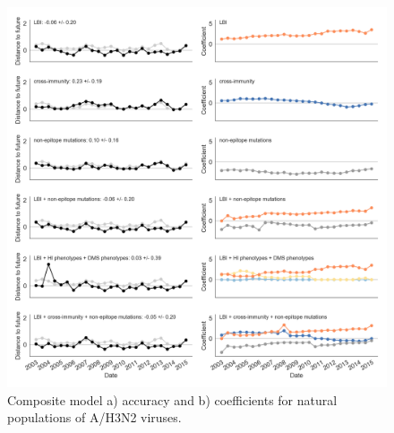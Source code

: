 \begin{figure}[t]
  \begin{center}
  \includegraphics[width=\textwidth]{figures/unadjusted-composite-model-accuracy-and-coefficients-for-natural-populations.png}
  \caption{Composite model a) accuracy and b) coefficients for natural populations of A/H3N2 viruses.}
  \label{sup_fig:unadjusted_composite_model_accuracy_and_coefficients_for_natural_populations}
  \end{center}
\end{figure}
